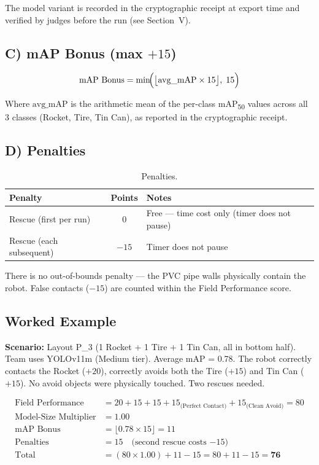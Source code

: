 \documentclass[a4]{article}
\begin{document}
The model variant is recorded in the cryptographic receipt at export time and verified by judges before the run (see Section~V).

\subsection*{C) mAP Bonus (max $+15$)}

\begin{equation*}
\text{mAP Bonus} = \min\!\Bigl(\bigl\lfloor \text{avg\_mAP} \times 15 \bigr\rfloor,\; 15\Bigr)
\end{equation*}

Where $\text{avg\_mAP}$ is the arithmetic mean of the per-class mAP\textsubscript{50} values across all 3 classes (Rocket, Tire, Tin Can), as reported in the cryptographic receipt.

\subsection*{D) Penalties}

\begin{table}[H]
\centering
\begin{tabular}{lcp{6.5cm}}
\toprule
\textbf{Penalty} & \textbf{Points} & \textbf{Notes} \\
\midrule
Rescue (first per run) & $0$ & Free --- time cost only (timer does not pause) \\
Rescue (each subsequent) & $-15$ & Timer does not pause \\
\bottomrule
\end{tabular}
\caption{Penalties.}
\end{table}

There is no out-of-bounds penalty --- the PVC pipe walls physically contain the robot. False contacts ($-15$) are counted within the Field Performance score.

\subsection*{Worked Example}

\textbf{Scenario:} Layout P\_3 (1 Rocket + 1 Tire + 1 Tin Can, all in bottom half). Team uses YOLOv11m (Medium tier). Average mAP = 0.78. The robot correctly contacts the Rocket ($+20$), correctly avoids both the Tire ($+15$) and Tin Can ($+15$). No avoid objects were physically touched. Two rescues needed.

\begin{align*}
\text{Field Performance} &= 20 + 15 + 15 + 15_{\text{(Perfect Contact)}} + 15_{\text{(Clean Avoid)}} = 80 \\
\text{Model-Size Multiplier} &= 1.00 \\
\text{mAP Bonus} &= \lfloor 0.78 \times 15 \rfloor = 11 \\
\text{Penalties} &= 15 \quad \text{(second rescue costs $-15$)} \\
\text{Total} &= (80 \times 1.00) + 11 - 15 = 80 + 11 - 15 = \mathbf{76}
\end{align*}
\end{document}
